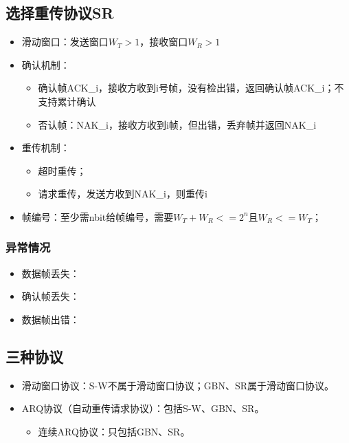 \subsection{选择重传协议SR}
\begin{itemize}
    \item 滑动窗口：发送窗口\(W_T > 1\)，接收窗口\(W_R > 1\)
    \item 确认机制：\begin{itemize}
        \item 确认帧ACK\_i，接收方收到i号帧，没有检出错，返回确认帧ACK\_i；不支持累计确认
        \item 否认帧：NAK\_i，接收方收到i帧，但出错，丢弃帧并返回NAK\_i
    \end{itemize}
    \item 重传机制：\begin{itemize}
        \item 超时重传；
        \item 请求重传，发送方收到NAK\_i，则重传i
    \end{itemize}
    \item 帧编号：至少需nbit给帧编号，需要\(W_T + W_R <= 2^n\)且\(W_R <= W_T\)；
\end{itemize}

\subsubsection{异常情况}
\begin{itemize}
    \item 数据帧丢失：
    \item 确认帧丢失：
    \item 数据帧出错：
\end{itemize}


\subsection{三种协议}
\begin{itemize}
    \item 滑动窗口协议：S-W不属于滑动窗口协议；GBN、SR属于滑动窗口协议。
    \item ARQ协议（自动重传请求协议）：包括S-W、GBN、SR。\begin{itemize}
        \item 连续ARQ协议：只包括GBN、SR。
    \end{itemize}
\end{itemize}

